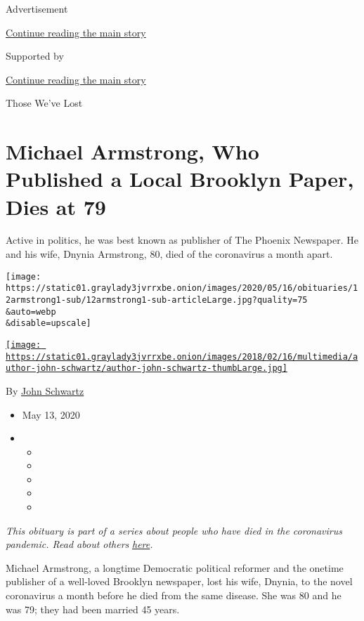 Advertisement

\protect\hyperlink{after-top}{Continue reading the main story}

Supported by

\protect\hyperlink{after-sponsor}{Continue reading the main story}

Those We've Lost

\hypertarget{michael-armstrong-who-published-a-local-brooklyn-paper-dies-at-79}{%
\section{Michael Armstrong, Who Published a Local Brooklyn Paper, Dies
at
79}\label{michael-armstrong-who-published-a-local-brooklyn-paper-dies-at-79}}

Active in politics, he was best known as publisher of The Phoenix
Newspaper. He and his wife, Dnynia Armstrong, 80, died of the
coronavirus a month apart.

\texttt{[image: https://static01.graylady3jvrrxbe.onion/images/2020/05/16/obituaries/12armstrong1-sub/12armstrong1-sub-articleLarge.jpg?quality=75\\\&auto=webp\\\&disable=upscale]}

\href{https://www.nytimes3xbfgragh.onion/by/john-schwartz}{\texttt{[image: https://static01.graylady3jvrrxbe.onion/images/2018/02/16/multimedia/author-john-schwartz/author-john-schwartz-thumbLarge.jpg]}}

By \href{https://www.nytimes3xbfgragh.onion/by/john-schwartz}{John
Schwartz}

\begin{itemize}
\item
  May 13, 2020
\item
  \begin{itemize}
  \item
  \item
  \item
  \item
  \item
  \end{itemize}
\end{itemize}

\emph{This obituary is part of a series about people who have died in
the coronavirus pandemic. Read about others}
\href{https://www.nytimes3xbfgragh.onion/series/people-who-have-died-of-the-coronavirus}{\emph{here}}\emph{.}

Michael Armstrong, a longtime Democratic political reformer and the
onetime publisher of a well-loved Brooklyn newspaper, lost his wife,
Dnynia, to the novel coronavirus a month before he died from the same
disease. She was 80 and he was 79; they had been married 45 years.

